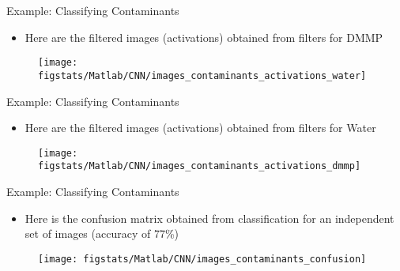 \documentclass[9pt]{beamer}
\begin{document}
\begin{frame}{Example: Classifying Contaminants}

\begin{itemize}
\item Here are the filtered images (activations) obtained from filters for DMMP
\end{itemize}

\begin{figure}[!htb]
    \centering
\texttt{[image: figstats/Matlab/CNN/images\_contaminants\_activations\_water]}
\end{figure}

\end{frame}

\begin{frame}{Example: Classifying Contaminants}

\begin{itemize}
\item Here are the filtered images (activations) obtained from filters for Water
\end{itemize}

\begin{figure}[!htb]
    \centering
\texttt{[image: figstats/Matlab/CNN/images\_contaminants\_activations\_dmmp]}
\end{figure}

\end{frame}

\begin{frame}{Example: Classifying Contaminants}

\begin{itemize}
\item Here  is the confusion matrix obtained from classification for an independent set of images (accuracy of 77\%)
\end{itemize}

\begin{figure}[!htb]
    \centering
\texttt{[image: figstats/Matlab/CNN/images\_contaminants\_confusion]}
\end{figure}

\end{frame}
\end{document}
